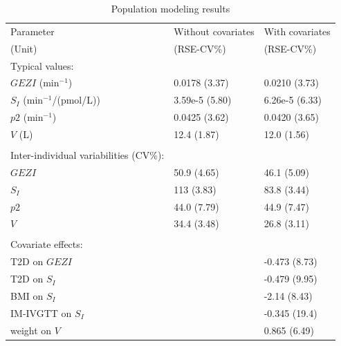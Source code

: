 \documentclass[utf8]{frontiersSCNS} %
\begin{document}
\begin{table}[h]
\caption{Population modeling results}
\label{tab:prm estimates}
\begin{tabular}{lll}
\hline
Parameter   & Without covariates & With covariates \\
(Unit)    & (RSE-CV\%) & (RSE-CV\%)\\ 
\hline
Typical values: \\
\hspace{.2cm} $GEZI$ (min$^{-1}$)                  & 0.0178 (3.37) & 0.0210 (3.73) \\
\hspace{.2cm} $S_I$ (min$^{-1}$/(pmol/L)) & 3.59e-5 (5.80)                          & 6.26e-5 (6.33)                        \\
\hspace{.2cm} $p2$ (min$^{-1}$)                    & 0.0425 (3.62) & 0.0420 (3.65) \\
\hspace{.2cm} $V$ (L)                         & 12.4 (1.87)   & 12.0 (1.56)   \\
                              &               &               \\
Inter-individual variabilities (CV\%): \\
\hspace{.2cm} $GEZI$                      & 50.9 (4.65)   & 46.1 (5.09)   \\
\hspace{.2cm} $S_I$                        & 113 (3.83)    & 83.8 (3.44)   \\
\hspace{.2cm} $p2$                        & 44.0 (7.79)   & 44.9 (7.47)   \\
\hspace{.2cm} $V$                         & 34.4 (3.48)   & 26.8 (3.11)   \\
                              &               &               \\
Covariate effects: &               &               \\
\hspace{.2cm} T2D on $GEZI$                  &               & -0.473 (8.73) \\
\hspace{.2cm} T2D on $S_I$                     &               & -0.479 (9.95) \\
\hspace{.2cm} BMI on $S_I$                     &               & -2.14 (8.43)  \\
\hspace{.2cm} IM-IVGTT on $S_I$                       &               & -0.345 (19.4)  \\ 
\hspace{.2cm} weight on $V$                       &               & 0.865 (6.49)  \\ 


\end{tabular}
\end{table}
\end{document}
